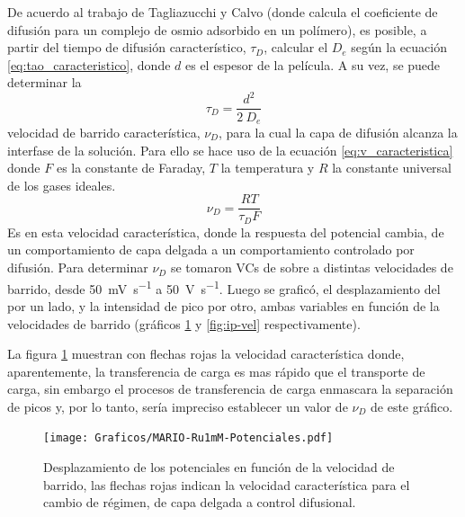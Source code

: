 	   	 De acuerdo al trabajo de Tagliazucchi y Calvo\cite{Tagliazucchi2010a} (donde calcula el coeficiente de difusión para un complejo de osmio adsorbido en un polímero), es posible, a partir del tiempo de difusión característico, $\tau_{\scriptscriptstyle{D}}$, calcular el $D_e$ según la ecuación \ref{eq:tao_caracteristico}, donde $d$ es el espesor de la película. A su vez, se puede determinar la \linebreak
	   		\begin{equation}
					\tau_{\scriptscriptstyle{D}}=\frac{d^2}{2\ D_e}
					\label{eq:tao_caracteristico}
			 \end{equation} 
  	  	  velocidad de barrido característica, $\nu_{\scriptscriptstyle{D}}$, para la cual la capa de difusión alcanza la interfase de la solución. Para ello se hace uso de la ecuación \ref{eq:v_caracteristica} donde $F$ es la constante de Faraday, $T$ la temperatura y $R$ la constante universal de los gases ideales.
	  	   	 \begin{equation}
					\nu_{\scriptscriptstyle{D}}=\frac{RT}{\tau_{\scriptscriptstyle{D}}F}
					\label{eq:v_caracteristica}
			 \end{equation}
	     \indent Es en esta velocidad característica, donde la respuesta del potencial cambia, de un comportamiento de capa delgada a un comportamiento controlado por difusión. Para determinar $\nu_{\scriptscriptstyle{D}}$ se tomaron VCs de \ru\space sobre \pdmF\space a distintas velocidades de barrido, desde \SI{50}{\milli\volt\per\second} a \SI{50}{\volt\per\second}. Luego se graficó, el desplazamiento del por un lado, y la intensidad de pico por otro, ambas variables en función de la velocidades de barrido (gráficos \ref{fig:corrimiento-potenciales} y \ref{fig:ip-vel} respectivamente).

	     La figura \ref{fig:corrimiento-potenciales} muestran con flechas rojas la velocidad característica donde, aparentemente, la transferencia de carga es mas rápido que el transporte de carga, sin embargo el procesos de transferencia de carga enmascara la separación de picos y, por lo tanto, sería impreciso establecer un valor de  $\nu_{\scriptscriptstyle{D}}$ de este gráfico.
			
			 \begin{figure}[ht]
					\centering
			 	    \texttt{[image: Graficos/MARIO-Ru1mM-Potenciales.pdf]}
			        \caption[Desplazamiento de potenciales]{Desplazamiento de los potenciales en función de la velocidad de barrido, las flechas rojas indican la velocidad característica para el cambio de régimen, de capa delgada a control difusional.}
			        \label{fig:corrimiento-potenciales}
			      	\end{figure}
         
